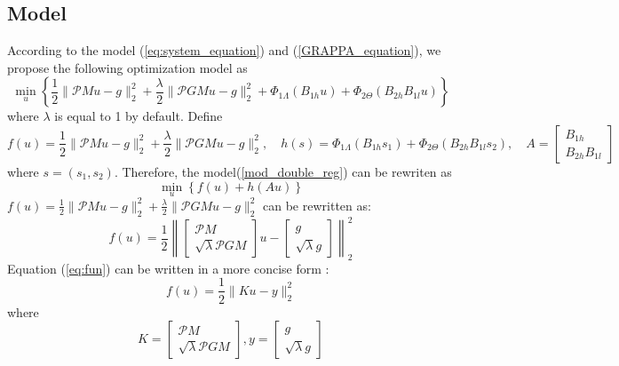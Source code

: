\documentclass[UTF8]{article}
\begin{document}
\subsection{Model}
\par According to the model (\ref{eq:system_equation}) and (\ref{GRAPPA_equation}), we propose the following optimization model as
\begin{equation}\label{mod_double_reg}
	\min_{u} \left\{\frac{1}{2}\|\mathcal{P}Mu-g\|_2^2+  \frac{\lambda}{2}\|\mathcal{P}GMu-g \|_2^2 + \Phi_{1 \Lambda}(B_{1h} u) + \Phi_{2 \Theta}(B_{2h}B_{1l} u) \right\} 
\end{equation}
where $\lambda$ is equal to 1 by default. Define 
\begin{equation*}
	f(u) = \frac{1}{2}\|\mathcal{P}Mu-g\|_2^2+  \frac{\lambda}{2}\|\mathcal{P}GMu-g \|_2^2, \quad h(s) = \Phi_{1 \Lambda}(B_{1h} s_1) + \Phi_{2 \Theta}(B_{2h}B_{1l} s_2),\quad A = \begin{bmatrix}
		B_{1h} \\
		B_{2h}B_{1l}
	\end{bmatrix}
\end{equation*}
where $s = (s_1, s_2)$. Therefore, the model(\ref{mod_double_reg}) can be rewriten as 
\begin{equation}
	\min_{u} \left\{ f(u) + h(Au) \right\}
\end{equation}
$f(u) = \frac{1}{2}\|\mathcal{P}Mu-g\|_2^2+  \frac{\lambda}{2}\|\mathcal{P}GMu-g \|_2^2$ can be rewritten as:
\begin{equation}\label{eq:fun}
	f(u) = \frac{1}{2}\left 
	\|\begin{bmatrix}
		\mathcal{P}M \\
		\sqrt{\lambda}\mathcal{P}GM 
	\end{bmatrix} u - 
	\begin{bmatrix}
		g \\ \sqrt{\lambda}g
	\end{bmatrix}
	\right \|_2^2
\end{equation}
Equation (\ref{eq:fun}) can be written in a more concise form :
\begin{equation}
	f(u) = \frac{1}{2}\| Ku - y\|_2^2
\end{equation}
where 
\begin{equation*}\label{eq7}
	K = \begin{bmatrix}
		\mathcal{P}M \\
		\sqrt{\lambda}\mathcal{P}GM 
	\end{bmatrix},
	y = \begin{bmatrix}
		g \\
		\sqrt{\lambda}g
	\end{bmatrix}
\end{equation*}
\end{document}
